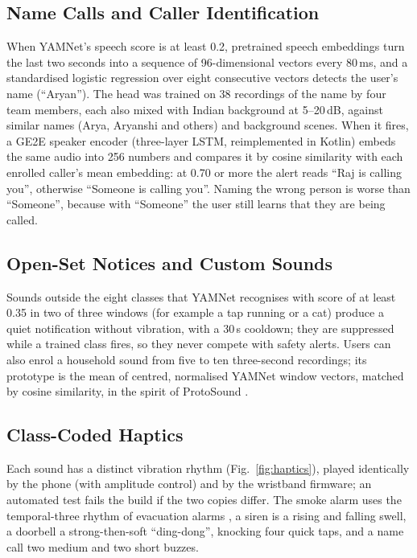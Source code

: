\documentclass[12pt,a4paper,oneside]{report}
\begin{document}
\subsection{Name Calls and Caller Identification}
When YAMNet's speech score is at least 0.2, pretrained speech embeddings \cite{lin2020,openwakeword} turn the last two seconds into a sequence of 96-dimensional vectors every 80\,ms, and a standardised logistic regression over eight consecutive vectors detects the user's name (``Aryan''). The head was trained on 38 recordings of the name by four team members, each also mixed with Indian background at 5--20\,dB, against similar names (Arya, Aryanshi and others) and background scenes. When it fires, a GE2E speaker encoder \cite{wan2018} (three-layer LSTM, reimplemented in Kotlin) embeds the same audio into 256 numbers and compares it by cosine similarity with each enrolled caller's mean embedding: at 0.70 or more the alert reads ``Raj is calling you'', otherwise ``Someone is calling you''. Naming the wrong person is worse than ``Someone'', because with ``Someone'' the user still learns that they are being called.

\subsection{Open-Set Notices and Custom Sounds}
Sounds outside the eight classes that YAMNet recognises with score of at least 0.35 in two of three windows (for example a tap running or a cat) produce a quiet notification without vibration, with a 30\,s cooldown; they are suppressed while a trained class fires, so they never compete with safety alerts. Users can also enrol a household sound from five to ten three-second recordings; its prototype is the mean of centred, normalised YAMNet window vectors, matched by cosine similarity, in the spirit of ProtoSound \cite{jain2022protosound}.

\subsection{Class-Coded Haptics}
Each sound has a distinct vibration rhythm (Fig.~\ref{fig:haptics}), played identically by the phone (with amplitude control) and by the wristband firmware; an automated test fails the build if the two copies differ. The smoke alarm uses the temporal-three rhythm of evacuation alarms \cite{iso8201}, a siren is a rising and falling swell, a doorbell a strong-then-soft ``ding-dong'', knocking four quick taps, and a name call two medium and two short buzzes.
\end{document}
